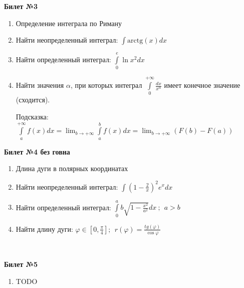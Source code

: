 \documentclass[a4paper, 12pt]{article}
\begin{document}
\begin{center}
	\textbf{Билет №3}
\end{center}
\begin{enumerate}
	\item Определение интеграла по Риману
	\item Найти неопределенный интеграл: $\displaystyle \int{\text{arctg}(x)dx}$
	\item Найти определенный интеграл: $\displaystyle \int\limits_{0}^{e}{\ln{x^2}dx}$
	\item Найти значения $\alpha$, при которых интеграл $\displaystyle \int\limits_{0}^{+\infty}{\frac{dx}{x^{\alpha}}}$ имеет конечное значение (сходится).
	
	Подсказка: $\displaystyle \int\limits_{a}^{+\infty}{f(x)dx} = \lim_{b\to+\infty}{\int\limits_{a}^{b}{f(x)dx}} = \lim_{b\to+\infty}{\left(F(b) - F(a)\right)} $
	
\end{enumerate}
\newpage
\begin{center}
	\textbf{Билет №4 без говна}
\end{center}
\begin{enumerate}
	\item Длина дуги в полярных координатах
	\item Найти неопределенный интеграл: $\displaystyle \int{\left(1-\frac{2}{x}\right)^2 e^xdx}$
	\item Найти определенный интеграл: $\displaystyle \int\limits_{0}^{a}{b\sqrt{1 - \frac{x^2}{a^2}}dx} \ ; \ \ a > b$
	\item Найти длину дуги: $\displaystyle \varphi \in \left[0, \frac{\pi}{4}\right];\ \  r(\varphi) = \displaystyle \frac{tg(\varphi)}{\cos{\varphi}}$
	
\end{enumerate}
\ \
\begin{center}
	\textbf{Билет №5}
\end{center}
\begin{enumerate}
	\item TODO	
\end{enumerate}
\end{document}
